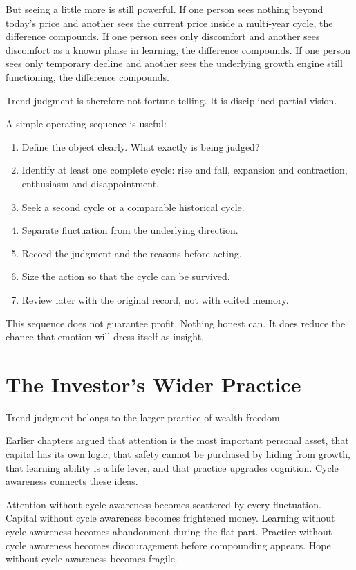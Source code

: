 But seeing a little more is still powerful. If one person sees nothing beyond today's price and another sees the current price inside a multi-year cycle, the difference compounds. If one person sees only discomfort and another sees discomfort as a known phase in learning, the difference compounds. If one person sees only temporary decline and another sees the underlying growth engine still functioning, the difference compounds.

Trend judgment is therefore not fortune-telling. It is disciplined partial vision.

A simple operating sequence is useful:

\begin{enumerate}
\item Define the object clearly. What exactly is being judged?
\item Identify at least one complete cycle: rise and fall, expansion and contraction, enthusiasm and disappointment.
\item Seek a second cycle or a comparable historical cycle.
\item Separate fluctuation from the underlying direction.
\item Record the judgment and the reasons before acting.
\item Size the action so that the cycle can be survived.
\item Review later with the original record, not with edited memory.
\end{enumerate}

This sequence does not guarantee profit. Nothing honest can. It does reduce the chance that emotion will dress itself as insight.

\section*{The Investor's Wider Practice}

Trend judgment belongs to the larger practice of wealth freedom.

Earlier chapters argued that attention is the most important personal asset, that capital has its own logic, that safety cannot be purchased by hiding from growth, that learning ability is a life lever, and that practice upgrades cognition. Cycle awareness connects these ideas.

Attention without cycle awareness becomes scattered by every fluctuation. Capital without cycle awareness becomes frightened money. Learning without cycle awareness becomes abandonment during the flat part. Practice without cycle awareness becomes discouragement before compounding appears. Hope without cycle awareness becomes fragile.

